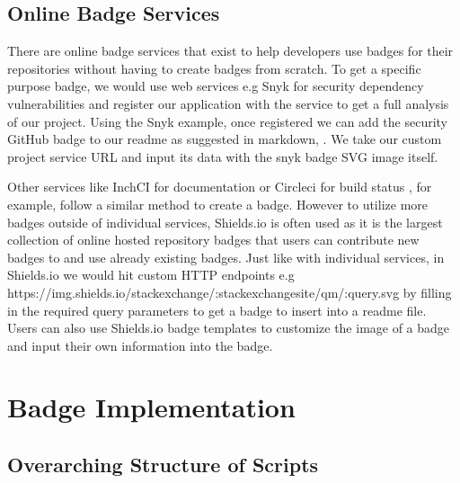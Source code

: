 \documentclass[12pt, letterpaper]{article}
\begin{document}
\subsection{Online Badge Services}
There are online badge services that exist to help developers use badges for their
repositories without having to create badges from scratch. To get a specific purpose badge,
we would use web services e.g Snyk for security dependency vulnerabilities \cite{snyk} and register
our application with the service to get a full analysis of our project. 
Using the Snyk example, once registered we can add the security GitHub badge to our readme as
suggested in markdown, 
\cite{snyk}. 
We take our custom project service URL and input its data with the snyk badge SVG image itself.


Other services like InchCI for documentation \cite{inchci} or Circleci for build status \cite{circleci}, for example,
follow a similar method to create a badge. 
However to utilize more badges outside of individual services, Shields.io \cite{shields} is often used
as it is the largest collection
of online hosted repository badges that users can contribute new badges to and use already
existing badges. Just like with individual services, in Shields.io \cite{shields} we would hit custom
HTTP endpoints e.g https://img.shields.io/stackexchange/:stackexchangesite/qm/:query.svg \cite{shields} 
by filling in the 
required query parameters to get a badge to insert into a readme file. 
Users can also use Shields.io \cite{shields} badge templates to customize the image of a badge and 
input their own information into the badge.


\section{Badge Implementation}
\subsection{Overarching Structure of Scripts}
\end{document}

